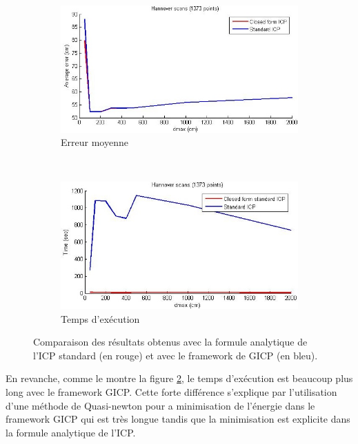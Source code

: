 \begin{figure}[!h]
   \centering
   \begin{subfigure}[t]{.5\linewidth}
     \centering
     \includegraphics[scale=0.4]{Images/Resultats/hannover_diff_ICP_closed_form_dmax.jpg}
     \caption{Erreur moyenne}
     \label{fig:CFICP:err}
   \end{subfigure}%
   ~
   \begin{subfigure}[t]{.5\linewidth}
     \centering
     \includegraphics[scale=0.4]{Images/Resultats/hannover_diff_time_ICP_closed_form_dmax.jpg}
     \caption{Temps d'exécution}
     \label{fig:CFICP:time}
   \end{subfigure}
   
   \caption{Comparaison des résultats obtenus avec la formule analytique de l'ICP standard (en rouge) et avec le framework de GICP (en bleu).}
   \label{fig:closedform_ICP}
\end{figure}

En revanche, comme le montre la figure \ref{fig:CFICP:time}, le temps d'exécution est beaucoup plus long avec le framework GICP. Cette forte différence s'explique par l'utilisation d'une méthode de Quasi-newton pour a minimisation de l'énergie dans le framework GICP qui est très longue tandis que la minimisation est explicite dans la formule analytique de l'ICP.
